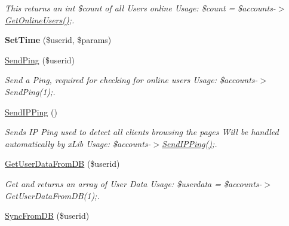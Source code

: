 \begin{DoxyCompactItemize}
\begin{DoxyCompactList}\small\item\em This returns an int \$count of all Users online Usage\-: \$count = \$accounts-\/$>$\hyperlink{class_u_e4___account_handler_acd1ece5e2413a2422d27e6ce768f767e}{Get\-Online\-Users()};. \end{DoxyCompactList}\item 
\hypertarget{class_u_e4___account_handler_a221de2e5da98c36c55bcf232abe15f0c}{{\bfseries Set\-Time} (\$userid, \$params)}\label{class_u_e4___account_handler_a221de2e5da98c36c55bcf232abe15f0c}

\item 
\hypertarget{class_u_e4___account_handler_a1908680a6760b1256fb20959f0d11ae7}{\hyperlink{class_u_e4___account_handler_a1908680a6760b1256fb20959f0d11ae7}{Send\-Ping} (\$userid)}\label{class_u_e4___account_handler_a1908680a6760b1256fb20959f0d11ae7}

\begin{DoxyCompactList}\small\item\em Send a Ping, required for checking for online users Usage\-: \$accounts-\/$>$Send\-Ping(1);. \end{DoxyCompactList}\item 
\hypertarget{class_u_e4___account_handler_a36c70407684b1436a2f5e56deb0c7953}{\hyperlink{class_u_e4___account_handler_a36c70407684b1436a2f5e56deb0c7953}{Send\-I\-P\-Ping} ()}\label{class_u_e4___account_handler_a36c70407684b1436a2f5e56deb0c7953}

\begin{DoxyCompactList}\small\item\em Sends I\-P Ping used to detect all clients browsing the pages Will be handled automatically by x\-Lib Usage\-: \$accounts-\/$>$\hyperlink{class_u_e4___account_handler_a36c70407684b1436a2f5e56deb0c7953}{Send\-I\-P\-Ping()};. \end{DoxyCompactList}\item 
\hyperlink{class_u_e4___account_handler_ad77529ce7c6e199ee187c5ab1ad6088b}{Get\-User\-Data\-From\-D\-B} (\$userid)
\begin{DoxyCompactList}\small\item\em Get and returns an array of User Data Usage\-: \$userdata = \$accounts-\/$>$Get\-User\-Data\-From\-D\-B(1);. \end{DoxyCompactList}\item 
\hypertarget{class_u_e4___account_handler_a2c83b3b58f4170d6dce1c1691ba3b74a}{\hyperlink{class_u_e4___account_handler_a2c83b3b58f4170d6dce1c1691ba3b74a}{Sync\-From\-D\-B} (\$userid)}\label{class_u_e4___account_handler_a2c83b3b58f4170d6dce1c1691ba3b74a}


\end{DoxyCompactItemize}
